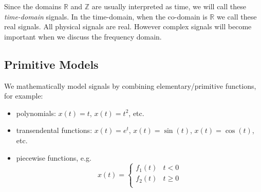 Since the domains $\mathbb{R}$ and $\mathbb{Z}$ are usually interpreted as time, we will call these {\it time-domain} signals. In the time-domain, when the co-domain is $\mathbb{R}$ we call these real signals. All physical signals are real. However complex signals will become important when we discuss the frequency domain.

\subsection{Primitive Models}

We mathematically model signals by combining elementary/primitive functions, for example:
  
\begin{itemize}
\item polynomials: $x(t) = t$, $x(t) = t^2$, etc.
\item transendental functions: $x(t) = e^t$, $x(t) = \sin(t)$, $x(t) = \cos(t)$, etc.
\item piecewise functions, e.g.
  \[
     x(t) = \left\{  \begin{array}{cl}
       f_1(t) & t < 0\\
       f_2(t) & t \geq 0\\
     \end{array}\right.
     \]
\end{itemize}

